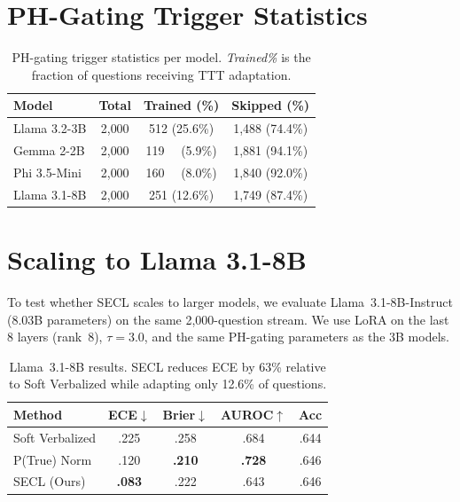 \section{PH-Gating Trigger Statistics} \label{app:ph_stats}

\begin{table}[h]
\centering
\caption{PH-gating trigger statistics per model.
\emph{Trained\%} is the fraction of questions receiving TTT adaptation.}
\label{tab:ph_triggers}
\small
\begin{tabular}{@{}lccc@{}}
\toprule
\textbf{Model} & \textbf{Total} & \textbf{Trained (\%)} & \textbf{Skipped (\%)} \\
\midrule
Llama 3.2-3B & 2{,}000 & 512 (25.6\%) & 1{,}488 (74.4\%) \\
Gemma 2-2B   & 2{,}000 & 119 ~~(5.9\%) & 1{,}881 (94.1\%) \\
Phi 3.5-Mini & 2{,}000 & 160 ~~(8.0\%) & 1{,}840 (92.0\%) \\
Llama 3.1-8B & 2{,}000 & 251 (12.6\%) & 1{,}749 (87.4\%) \\
\bottomrule
\end{tabular}
\end{table}


\section{Scaling to Llama 3.1-8B} \label{app:scaling_8b}

To test whether SECL scales to larger models, we evaluate
Llama~3.1-8B-Instruct (8.03B parameters) on the same 2{,}000-question stream.
We use LoRA on the last 8 layers (rank~8), $\tau{=}3.0$,
and the same PH-gating parameters as the 3B models.

\begin{table}[h]
\centering
\caption{Llama~3.1-8B results. SECL reduces ECE by 63\% relative
to Soft Verbalized while adapting only 12.6\% of questions.}
\label{tab:8b_results}
\small
\begin{tabular}{@{}lcccc@{}}
\toprule
\textbf{Method}
  & \textbf{ECE}$\downarrow$ & \textbf{Brier}$\downarrow$
  & \textbf{AUROC}$\uparrow$ & \textbf{Acc} \\
\midrule
Soft Verbalized      & .225 & .258 & .684 & .644 \\
P(True) Norm         & .120 & \textbf{.210} & \textbf{.728} & .646 \\
SECL (Ours)          & \textbf{.083} & .222 & .643 & .646 \\
\bottomrule
\end{tabular}
\end{table}

